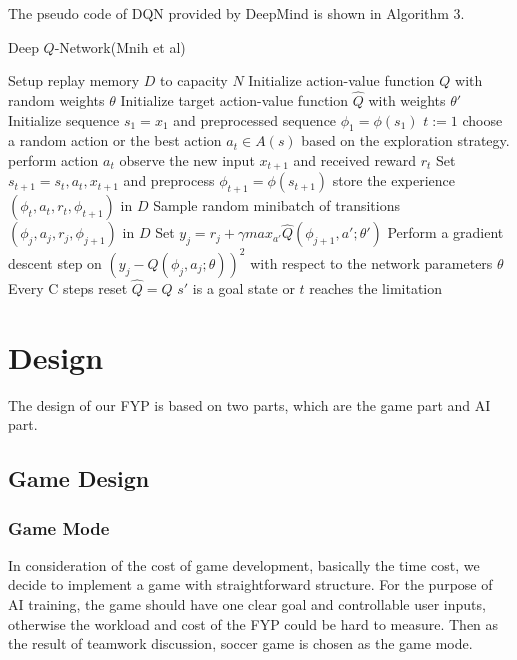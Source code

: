 \documentclass[14pt]{extarticle}
\begin{document}
The pseudo code of DQN provided by DeepMind is shown in Algorithm 3.
\begin{algorithm}[H]
    \caption{Deep $Q$-Network(Mnih et al)}\label{euclid}
    \begin{algorithmic}[1]
    \State Setup replay memory $D$ to capacity $N$
    \State Initialize action-value function $Q$ with random weights $\theta$
    \State Initialize target action-value function $\hat{Q}$ with weights $\theta'$
        \State Initialize sequence $s_1 = {x_1}$ and preprocessed sequence $\phi_1 = \phi(s_1)$
        \State $t := 1$
        \Repeat
            \State choose a random action or the best action $a_t \in A(s)$ based on the exploration strategy.
            \State perform action $a_t$
            \State observe the new input $x_{t+1}$ and received reward $r_t$
            \State Set $s_{t+1} = s_t,a_t,x_{t+1}$ and preprocess $\phi_{t+1} = \phi(s_{t+1})$
            \State store the experience $(\phi_t, a_t, r_t, \phi_{t+1})$ in $D$
            \State Sample random minibatch of transitions $(\phi_j, a_j, r_j, \phi_{j+1})$ in $D$
            \State Set $y_j = r_j + \gamma max_{a'} \hat{Q}(\phi_{j+1},a'; \theta')$
            \State Perform a gradient descent step on $(y_j - Q(\phi_j, a_j; \theta))^2$ with respect to the network parameters $\theta$
            \State Every C steps reset $\hat{Q} = Q$ 
        \Until $s'$ is a goal state or $t$ reaches the limitation
    \EndFor
    \end{algorithmic}
\end{algorithm}

\section{Design}

The design of our FYP is based on two parts, which are the game part and AI part.

\subsection{Game Design}

\subsubsection{Game Mode}
In consideration of the cost of game development, basically the time cost, we decide to implement a game with straightforward structure. For the purpose of AI training, the game should have one clear goal and controllable user inputs, otherwise the workload and cost of the FYP could be hard to measure. Then as the result of teamwork discussion, soccer game is chosen as the game mode.
\end{document}

